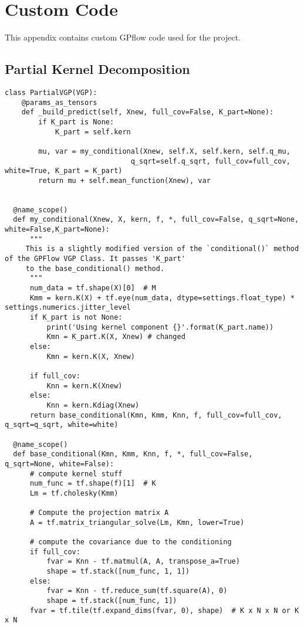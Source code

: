 \clearpage
\label{AppendixC}
\vspace{-1.75cm}
\section{Custom Code}

This appendix contains custom GPflow code used for the project.

\subsection{Partial Kernel Decomposition}

\begin{verbatim}
class PartialVGP(VGP):
    @params_as_tensors
    def _build_predict(self, Xnew, full_cov=False, K_part=None):
        if K_part is None:
            K_part = self.kern

        mu, var = my_conditional(Xnew, self.X, self.kern, self.q_mu,
                              q_sqrt=self.q_sqrt, full_cov=full_cov, white=True, K_part = K_part)
        return mu + self.mean_function(Xnew), var


  @name_scope()
  def my_conditional(Xnew, X, kern, f, *, full_cov=False, q_sqrt=None, white=False,K_part=None):
      """
     This is a slightly modified version of the `conditional()` method of the GPFlow VGP Class. It passes 'K_part'
     to the base_conditional() method.
      """
      num_data = tf.shape(X)[0]  # M
      Kmm = kern.K(X) + tf.eye(num_data, dtype=settings.float_type) * settings.numerics.jitter_level
      if K_part is not None:
          print('Using kernel component {}'.format(K_part.name))
          Kmn = K_part.K(X, Xnew) # changed
      else:
          Kmn = kern.K(X, Xnew)

      if full_cov:
          Knn = kern.K(Xnew)
      else:
          Knn = kern.Kdiag(Xnew)
      return base_conditional(Kmn, Kmm, Knn, f, full_cov=full_cov, q_sqrt=q_sqrt, white=white)

  @name_scope()
  def base_conditional(Kmn, Kmm, Knn, f, *, full_cov=False, q_sqrt=None, white=False):
      # compute kernel stuff
      num_func = tf.shape(f)[1]  # K
      Lm = tf.cholesky(Kmm)

      # Compute the projection matrix A
      A = tf.matrix_triangular_solve(Lm, Kmn, lower=True)

      # compute the covariance due to the conditioning
      if full_cov:
          fvar = Knn - tf.matmul(A, A, transpose_a=True)
          shape = tf.stack([num_func, 1, 1])
      else:
          fvar = Knn - tf.reduce_sum(tf.square(A), 0)
          shape = tf.stack([num_func, 1])
      fvar = tf.tile(tf.expand_dims(fvar, 0), shape)  # K x N x N or K x N


\end{verbatim}
